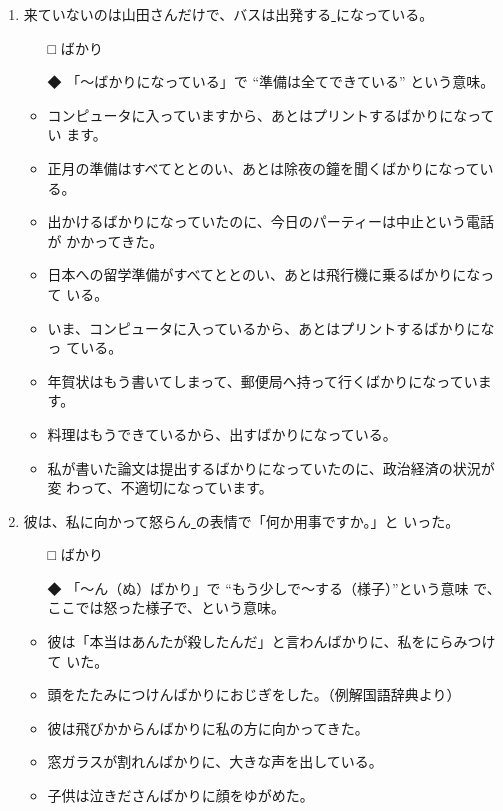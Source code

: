 \documentclass[
uplatex,
b5paper,
10pt,
dvipdfmx
]{jsbook}
\begin{document}
\begin{enumerate}
\item 来ていないのは山田さんだけで、バスは出発する\underline{   }になっている。
\begin{itemize}
\item[□] ばかり
\item[◆] 「〜ばかりになっている」で ``準備は全てできている'' という意味。
\end{itemize}
\begin{itemize}
\item コンピュータに入っていますから、あとはプリントするばかりになってい
      ます。
\item 正月の準備はすべてととのい、あとは除夜の鐘を聞くばかりになっている。
\item 出かけるばかりになっていたのに、今日のパーティーは中止という電話が
      かかってきた。
\item 日本への留学準備がすべてととのい、あとは飛行機に乗るばかりになって
      いる。
\item いま、コンピュータに入っているから、あとはプリントするばかりになっ
      ている。
\item 年賀状はもう書いてしまって、郵便局へ持って行くばかりになっています。
\item 料理はもうできているから、出すばかりになっている。
\item 私が書いた論文は提出するばかりになっていたのに、政治経済の状況が変
      わって、不適切になっています。
\end{itemize}

\item 彼は、私に向かって怒らん\underline{    }の表情で「何か用事ですか。」と
      いった。
\begin{itemize}
\item[□] ばかり
\item[◆] 「〜ん（ぬ）ばかり」で ``もう少しで〜する（様子）''という意味
	   で、ここでは怒った様子で、という意味。
\end{itemize}
\begin{itemize}
\item 彼は「本当はあんたが殺したんだ」と言わんばかりに、私をにらみつけて
      いた。
\item 頭をたたみにつけんばかりにおじぎをした。（例解国語辞典より）
\item 彼は飛びかからんばかりに私の方に向かってきた。
\item 窓ガラスが割れんばかりに、大きな声を出している。
\item 子供は泣きださんばかりに顔をゆがめた。
\end{itemize}


\end{enumerate}
\end{document}
